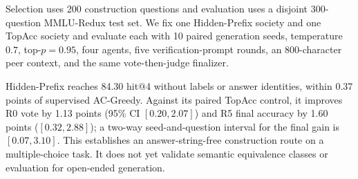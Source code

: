 Selection uses 200 construction questions and evaluation uses a disjoint
300-question MMLU-Redux test set. We fix one Hidden-Prefix society and one
TopAcc society and evaluate each with 10 paired generation seeds, temperature
$0.7$, top-$p=0.95$, four agents, five verification-prompt rounds, an
800-character peer context, and the same vote-then-judge finalizer.

\begin{table}[H]
\centering
\caption{Fixed-society Qwen3-4B MMLU-Redux results. Hidden-Prefix and TopAcc
report mean $\pm$ SD across 10 paired generation seeds; AC-Greedy and
SC-Greedy are the submitted fixed runs and are included only as reference
points.}
\label{tab:hidden_prefix_construction}
\small
{}
\end{table}

Hidden-Prefix reaches 84.30 hit@4 without labels or answer identities, within
0.37 points of supervised AC-Greedy. Against its paired TopAcc control, it
improves R0 vote by 1.13 points (95\% CI $[0.20,2.07]$) and R5 final accuracy
by 1.60 points ($[0.32,2.88]$); a two-way seed-and-question interval for the
final gain is $[0.07,3.10]$. This establishes an answer-string-free
construction route on a multiple-choice task. It does not yet validate
semantic equivalence classes or evaluation for open-ended generation.
